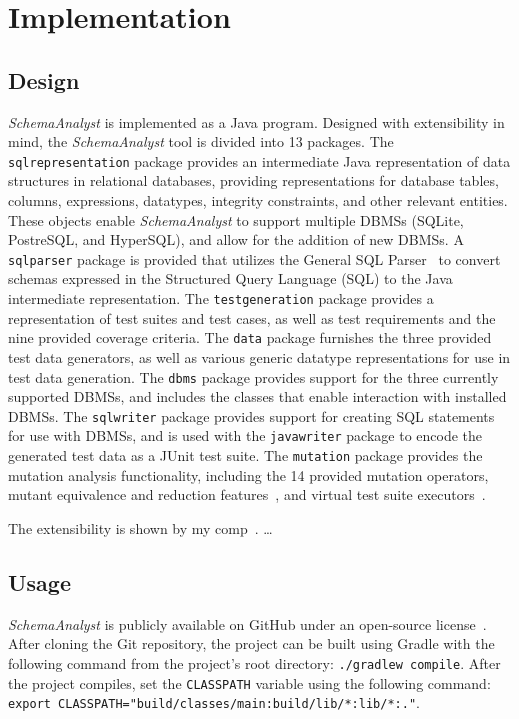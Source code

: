 \section{Implementation}\label{sec:implementation}
\subsection{Design}
\textit{SchemaAnalyst} is implemented as a Java program.  Designed with extensibility in mind, the
\textit{SchemaAnalyst} tool is divided into 13 packages. The \texttt{sqlrepresentation} package
provides an intermediate Java representation of data structures in relational databases,
providing representations for database tables, columns, expressions, datatypes, integrity
constraints, and other relevant entities. These objects enable \textit{SchemaAnalyst} to support multiple
DBMSs (SQLite, PostreSQL, and HyperSQL), and allow for the addition of new DBMSs. A \texttt{sqlparser}
package is provided that utilizes the General SQL Parser~\cite{} to convert schemas expressed in the
Structured Query Language (SQL) to the Java intermediate representation. The \texttt{testgeneration} 
package provides a representation of test suites and test cases, as well as test requirements and the
nine provided coverage criteria. The \texttt{data} package furnishes the three provided test data generators,
as well as various generic datatype representations for use in test data generation. The \texttt{dbms} package
provides support for the three currently supported DBMSs, and includes the classes that enable interaction with
installed DBMSs. The \texttt{sqlwriter} package provides support for creating SQL statements for use
with DBMSs, and is used with the \texttt{javawriter} package to encode the generated test data as a
JUnit test suite. The \texttt{mutation} package provides the mutation analysis functionality, 
including the 14 provided mutation operators, mutant equivalence and reduction features~\cite{wright2014impact}, and virtual test suite executors~\cite{mcminn2016virtual}.

The extensibility is shown by my comp~\cite{kinneer2016comp}. \dots
\subsection{Usage}

\textit{SchemaAnalyst} is publicly available on GitHub under an open-source license~\cite{tool}. After
cloning the Git repository, the project can be built using Gradle with the following command from the
project's root directory: \lstinline{./gradlew compile}. After the project compiles, set the
\lstinline{CLASSPATH} variable using the following command: 
\lstinline{export CLASSPATH="build/classes/main:build/lib/*:lib/*:."}.

